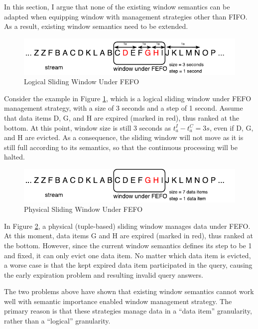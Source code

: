 In this section, I argue that none of the existing window semantics can be adapted when equipping window with management strategies other than FIFO.  
As a result, existing window semantics need to be extended. 

\begin{figure}[!htbp]
	\centering
    \includegraphics[width=5in]{img/3-wsti.pdf}
    \caption{Logical Sliding Window Under FEFO}
    \label{fig:3-wsti}
\end{figure}

Consider the example in Figure \ref{fig:3-wsti}, which is a logical sliding window under FEFO management strategy, with a size of 3 seconds and a step of 1 second. 
Assume that data items D, G, and H are expired (marked in red), thus ranked at the bottom. 
At this point, window size is still 3 seconds as $t^{I}_{a} - t^{C}_{a} = 3s$, even if D, G, and H are evicted.  
As a consequence, the sliding window will not move as it is still full according to its semantics, so that the continuous processing will be halted. 

\begin{figure}[!htbp]
	\centering
    \includegraphics[width=5in]{img/3-wstu.pdf}
    \caption{Physical Sliding Window Under FEFO}
    \label{fig:3-wstu}
\end{figure}

In Figure \ref{fig:3-wstu}, a physical (tuple-based) sliding window manages data under FEFO. 
At this moment, data items G and H are expired (marked in red), thus ranked at the bottom. 
However, since the current window semantics defines its step to be 1 and fixed, it can only evict one data item. 
No matter which data item is evicted, a worse case is that the kept expired data item participated in the query, causing the early expiration problem and resulting invalid query answers. 

The two problems above have shown that existing window semantics cannot work well with semantic importance enabled window management strategy. 
The primary reason is that these strategies manage data in a ``data item'' granularity, rather than a ``logical'' granularity. 
%
